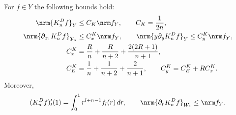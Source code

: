 \begin{lemma}\label{gd:lem:Poisson}
For $f\in Y$ the following bounds hold:
\begin{equation}\label{gd:eq:Poisson-constants}
 \begin{split}
 \nrm{K_n^Df}_Y&\le C_K\nrm f_Y,\qquad C_K=\frac1{2n},\\
 \nrm{\partial_{x_1}K_n^Df}_{\mathcal Y_n}&\le C_x^K\nrm f_Y,\qquad
 \nrm{y\partial_yK_n^Df}_Y\le C_y^K\nrm f_Y,\\
 C_x^K&=\frac Rn+\frac R{n+2}+\frac{2(2R+1)}{n+1},\\
 C_E^K&=\frac1n+\frac1{n+2}+\frac2{n+1},
 \qquad C_y^K=C_E^K+RC_x^K.
 \end{split}
\end{equation}
Moreover,
\begin{equation}\label{gd:eq:Poisson-trace}
 (K_n^Df)_l'(1)=\int_0^1r^{l+n-1}f_l(r)\,dr,\qquad
 \nrm{\partial_rK_n^Df}_{W_1}\le\nrm f_Y.
\end{equation}
\end{lemma}
